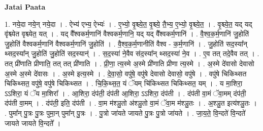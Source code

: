 \documentclass[17pt]{extarticle}
\begin{document}
\textbf{Jatai Paata} \newline

1. नये॒दा नये॒न् नये॒दा । . ऐभ्य॑ एभ्य॒ ऐभ्यः॑ । . ए॒भ्यो॒ वृ॒श्च्ये॒त॒ वृ॒श्च्ये॒ तै॒भ्य॒ ए॒भ्यो॒ वृ॒श्च्ये॒त॒ । . वृ॒श्च्ये॒त॒ यद् यद् वृ॑श्च्येत वृश्च्येत॒ यत् । . यद् वै᳚श्वकर्म॒णानि॑ वैश्वकर्म॒णानि॒ यद् यद् वै᳚श्वकर्म॒णानि॑ । . वै॒श्व॒क॒र्म॒णानि॑ जु॒होति॑ जु॒होति॑ वैश्वकर्म॒णानि॑ वैश्वकर्म॒णानि॑ जु॒होति॑ । . वै॒श्व॒क॒र्म॒णानीति॑ वैश्व - क॒र्म॒णानि॑ । . जु॒होति॑ सद॒स्या᳚न् थ्सद॒स्या᳚न् जु॒होति॑ जु॒होति॑ सद॒स्यान्॑ । . स॒द॒स्या॑ ने॒वैव स॑द॒स्या᳚न् थ्सद॒स्या॑ ने॒व । . ए॒व तत् तदे॒वैव तत् । . तत् प्री॑णाति प्रीणाति॒ तत् तत् प्री॑णाति । . प्री॒णा॒ त्य॒स्मे अ॒स्मे प्री॑णाति प्रीणा त्य॒स्मे । . अ॒स्मे दे॑वासो देवासो अ॒स्मे अ॒स्मे दे॑वासः । . अ॒स्मे इत्य॒स्मे । . दे॒वा॒सो॒ वपु॑षे॒ वपु॑षे देवासो देवासो॒ वपु॑षे । . वपु॑षे चिकिथ्सत चिकिथ्सत॒ वपु॑षे॒ वपु॑षे चिकिथ्सत । . चि॒कि॒थ्स॒त॒ यं ॅयम् चि॑किथ्सत चिकिथ्सत॒ यम् । . य मा॒शिरा॒ ऽऽशिरा॒ यं ॅय मा॒शिरा᳚ । . आ॒शिरा॒ दंप॑ती॒ दंप॑ती आ॒शिरा॒ ऽऽशिरा॒ दंप॑ती । . दंप॑ती वा॒मं ॅवा॒मम् दंप॑ती॒ दंप॑ती वा॒मम् । . दंप॑ती॒ इति॒ दंप॑ती । . वा॒म म॑श्ञु॒तो अ॑श्ञु॒तो वा॒मं ॅवा॒म म॑श्ञु॒तः । . अ॒श्ञु॒त इत्य॑श्ञु॒तः । . पुमा᳚न् पु॒त्रः पु॒त्रः पुमा॒न् पुमा᳚न् पु॒त्रः । . पु॒त्रो जा॑यते जायते पु॒त्रः पु॒त्रो जा॑यते । . जा॒य॒ते॒ वि॒न्दते॑ वि॒न्दते॑ जायते जायते वि॒न्दते᳚ । \newline
\end{document}
